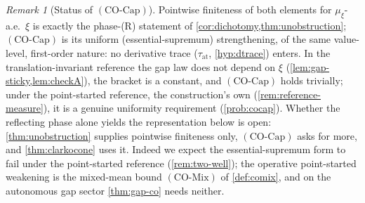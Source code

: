\documentclass[reqno,final,11pt]{amsart}
\theoremstyle{plain}
\theoremstyle{definition}
\theoremstyle{remark}
\newtheorem{remark}[theorem]{Remark}
\newcommand{\COcap}{(\mathrm{CO\text{-}Cap})}
\newcommand{\COmix}{(\mathrm{CO\text{-}Mix})}
\begin{document}
\begin{remark}[Status of $\COcap$]\label{rem:cocap-status}
Pointwise finiteness of both elements for $\mu_\xi$-a.e.\ $\xi$ is exactly the
phase-(R) statement of \cref{cor:dichotomy,thm:unobstruction}; $\COcap$ is its
uniform (essential-supremum) strengthening, of the same value-level, first-order
nature: no derivative trace ($\tau_{\mathrm{at}}$, \cref{hyp:dtrace}) enters. In
the translation-invariant reference the gap law does not depend on $\xi$
(\cref{lem:gap-sticky,lem:checkA}), the bracket is a constant, and $\COcap$ holds
trivially; under the point-started reference, the construction's own
(\cref{rem:reference-measure}), it is a genuine uniformity requirement
(\cref{prob:cocap}). Whether the reflecting phase alone yields the
representation below is open: \cref{thm:unobstruction} supplies pointwise
finiteness only, $\COcap$ asks for more, and \cref{thm:clarkocone} uses it.
Indeed we expect the essential-supremum form to fail under the point-started
reference (\cref{rem:two-well}); the operative point-started weakening is the
mixed-mean bound $\COmix$ of \cref{def:comix}, and on the autonomous gap sector
\cref{thm:gap-co} needs neither.
\end{remark}
\end{document}
